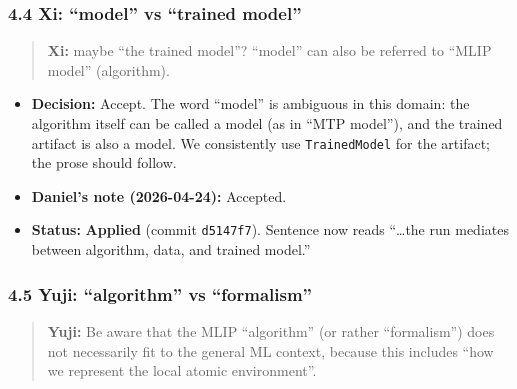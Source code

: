 \subsubsection{4.4 Xi: ``model'' vs ``trained model''}\label{xi-model-vs-trained-model}

\begin{quote}
\textbf{Xi:} maybe ``the trained model''? ``model'' can also be referred to ``MLIP model'' (algorithm).
\end{quote}

\begin{itemize}
\tightlist
\item
  \textbf{Decision:} Accept. The word ``model'' is ambiguous in this domain: the algorithm itself can be called a model (as in ``MTP model''), and the trained artifact is also a model. We consistently use \texttt{TrainedModel} for the artifact; the prose should follow.
\item
  \textbf{Daniel's note (2026-04-24):} Accepted.
\item
  \textbf{Status:} {\color{green!60!black}\faCheckCircle} \textbf{Applied} (commit \texttt{d5147f7}). Sentence now reads ``\ldots the run mediates between algorithm, data, and trained model.''
\end{itemize}

\subsubsection{4.5 Yuji: ``algorithm'' vs ``formalism''}\label{yuji-algorithm-vs-formalism}

\begin{quote}
\textbf{Yuji:} Be aware that the MLIP ``algorithm'' (or rather ``formalism'') does not necessarily fit to the general ML context, because this includes ``how we represent the local atomic environment''.
\end{quote}


